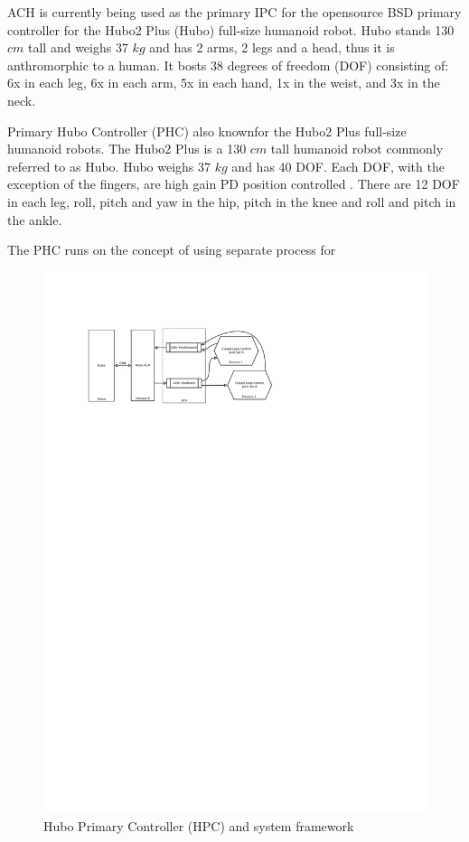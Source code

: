 ACH is currently being used as the primary IPC for the opensource BSD primary controller for the Hubo2 Plus (Hubo) full-size humanoid robot.  Hubo stands 130 $cm$ tall and weighs 37 $kg$ and has 2 arms, 2 legs and a head, thus it is anthromorphic to a human.  It bosts 38 degrees of freedom (DOF) consisting of: 6x in each leg, 6x in each arm, 5x in each hand, 1x in the weist, and 3x in the neck.

 Primary Hubo Controller (PHC) also knownfor the Hubo2 Plus full-size humanoid robots.  
The Hubo2 Plus is a 130 $cm$ tall humanoid robot commonly referred to as Hubo.  
Hubo weighs 37 $kg$ and has 40 DOF.
Each DOF, with the exception of the fingers, are high gain PD position controlled .  
There are 12 DOF in each leg, roll, pitch and yaw in the hip, pitch in the knee and roll and pitch in the ankle.  

The PHC runs on the concept of using separate process for 


\begin{figure}[thpb]
  \centering
\includegraphics[width=1.0\columnwidth]{./pix/hubo-ach-diagram.pdf}
  \caption{Hubo Primary Controller (HPC) and system framework}
  \label{fig:graph}
\end{figure}

